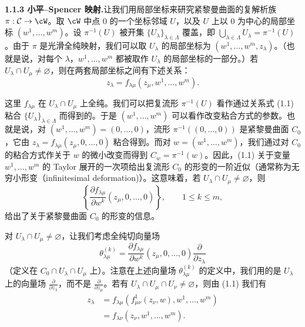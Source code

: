 
\noindent\textbf{1.1.3 小平–Spencer 映射.}\quad 让我们用局部坐标来研究紧黎曼曲面的复解析族 $\pi:\mathcal{C}\to\cW$。取 $\cW$ 中点 $0$ 的一个坐标邻域 $U$，以及 $U$ 上以 $0$ 为中心的局部坐标 $(w^1,\dots,w^m)$。设 $\pi^{-1}(U)$ 被开集 $\{U_\lambda\}_{\lambda\in\Lambda}$ 覆盖，即 $\bigcup_{\lambda\in\Lambda}U_\lambda=\pi^{-1}(U)$。由于 $\pi$ 是光滑全纯映射，我们可以取 $U_\lambda$ 的局部坐标为 $(w^1,\dots,w^m,z_\lambda)$。（也就是说，对每个 $\lambda$，$w^1,\dots,w^m$ 都被取作 $U_\lambda$ 的局部坐标的一部分。）若 $U_\lambda\cap U_\mu\ne\varnothing$，则在两套局部坐标之间有下述关系：
\begin{equation}
  z_\lambda=f_{\lambda\mu}(z_\mu,w^1,\dots,w^m). \tag{1.1}
\end{equation}

这里 $f_{\lambda\mu}$ 在 $U_\lambda\cap U_\mu$ 上全纯。我们可以把复流形 $\pi^{-1}(U)$ 看作通过关系式 (1.1) 粘合 $\{U_\lambda\}_{\lambda\in\Lambda}$ 而得到的。于是 $(w^1,\dots,w^m)$ 可以看作改变粘合方式的参数。也就是说，对 $(w^1,\dots,w^m)=(0,\dots,0)$，流形 $\pi^{-1}((0,\dots,0))$ 是紧黎曼曲面 $C_0$，它由 $z_\lambda=f_{\lambda\mu}(z_\mu,0,\dots,0)$ 粘合得到。而对 $w=(w^1,\dots,w^m)$，我们通过对 $C_0$ 的粘合方式作关于 $w$ 的微小改变而得到 $C_w=\pi^{-1}(w)$。因此，(1.1) 关于变量 $w^1,\dots,w^m$ 的 Taylor 展开的一次项给出复流形 $C_0$ 的形变的一阶近似（通常称为无穷小形变（infinitesimal deformation)）。这意味着，若 $U_\lambda\cap U_\mu\ne\varnothing$，则
\[
\left\{\frac{\partial f_{\lambda\mu}}{\partial w^k}(z_\mu,0,\dots,0)\right\},\qquad 1\le k\le m,
\]
给出了关于紧黎曼曲面 $C_0$ 的形变的信息。

对 $U_\lambda\cap U_\mu\ne\varnothing$，让我们考虑全纯切向量场
\begin{equation}
  \theta^{(k)}_{\lambda\mu}=\frac{\partial f_{\lambda\mu}}{\partial w^k}(z_\mu,0,\dots,0)\frac{\partial}{\partial z_\lambda} \tag{1.2}
\end{equation}
（定义在 $C_0\cap U_\lambda\cap U_\mu$ 上）。注意在上述向量场 $\theta^{(k)}_{\lambda\mu}$ 的定义中，我们用的是 $U_\lambda$ 上的向量场 $\frac{\partial}{\partial z_\lambda}$，而不是 $\frac{\partial}{\partial z_\mu}$。若有 $U_\lambda\cap U_\mu\cap U_\nu\ne\varnothing$，则由 (1.1) 我们有
\[
\begin{aligned}
z_\lambda &= f_{\lambda\mu}\left(f^{1}_{\mu\nu}(z_\nu,w),w^1,\dots,w^m\right)\\
&= f_{\lambda\nu}(z_\nu,w^1,\dots,w^m).
\end{aligned}
\]

